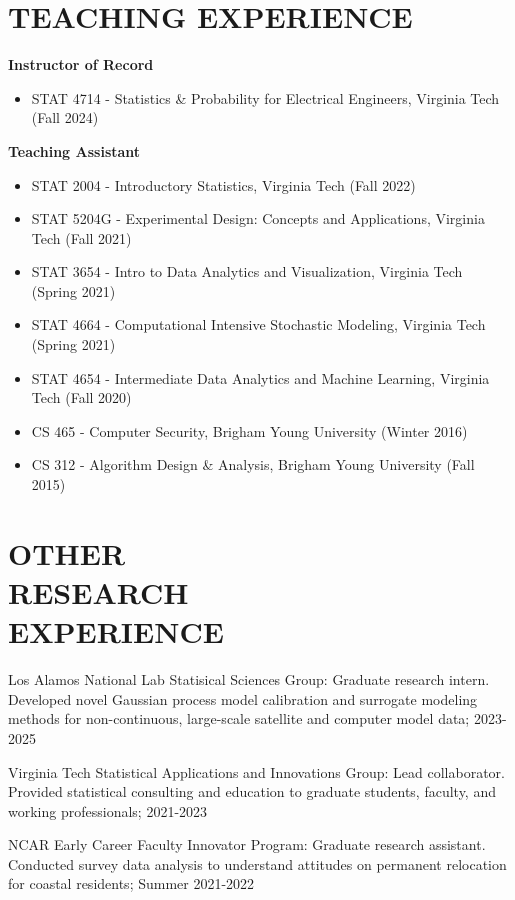 \documentclass[margin,line]{res}
\begin{document}
\begin{resume}
\section{TEACHING EXPERIENCE}

{\bf Instructor of Record}
\begin{itemize}
\itemsep -0.9pt
\item {\sc STAT 4714} - Statistics \& Probability for Electrical Engineers, {\sc Virginia Tech} (Fall 2024)
\end{itemize}

{\bf Teaching Assistant}
\begin{itemize}
\itemsep -0.9pt
\item {\sc STAT 2004} - Introductory Statistics, {\sc Virginia Tech} (Fall 2022)
\item {\sc STAT 5204G} - Experimental Design: Concepts and Applications, {\sc Virginia Tech} (Fall 2021)
\item {\sc STAT 3654} - Intro to Data Analytics and Visualization, {\sc Virginia Tech} (Spring 2021)
\item {\sc STAT 4664} - Computational Intensive Stochastic Modeling, {\sc Virginia Tech} (Spring 2021)
\item {\sc STAT 4654} - Intermediate Data Analytics and Machine Learning, {\sc Virginia Tech} (Fall 2020)
\item {\sc CS 465} - Computer Security, {\sc Brigham Young University} (Winter 2016)
\item {\sc CS 312} - Algorithm Design \& Analysis, {\sc Brigham Young University} (Fall 2015)
\end{itemize}

\section{OTHER \\RESEARCH \\EXPERIENCE}

{\sc Los Alamos National Lab Statisical Sciences Group}: Graduate research intern.  Developed novel Gaussian process model calibration and surrogate modeling methods for non-continuous, large-scale satellite and computer model data; 2023-2025

{\sc Virginia Tech Statistical Applications and Innovations Group}: Lead collaborator.  Provided statistical consulting and education to graduate students, faculty, and working professionals; 2021-2023

{\sc NCAR Early Career Faculty Innovator Program}: Graduate research assistant.  Conducted survey data analysis to understand attitudes on permanent relocation for coastal residents; Summer 2021-2022


\end{resume}
\end{document}
